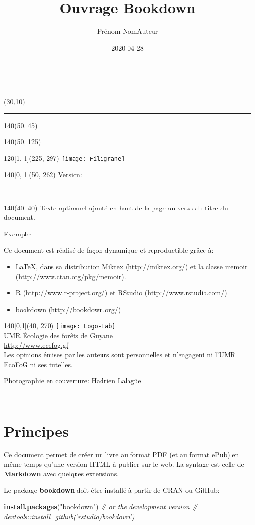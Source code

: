 \documentclass[
  11pt,
  french,
  a4paper,
  extrafontsizes,onecolumn,openright
  ]{memoir}
\title{Ouvrage Bookdown}
\author{Prénom NomAuteur}
\date{2020-04-28}
\newenvironment{Shaded}{\begin{snugshade}}{\end{snugshade}}
\newcommand{\CommentTok}[1]{\textcolor[rgb]{0.56,0.35,0.01}{\textit{#1}}}
\newcommand{\KeywordTok}[1]{\textcolor[rgb]{0.13,0.29,0.53}{\textbf{#1}}}
\newcommand{\NormalTok}[1]{#1}
\newcommand{\StringTok}[1]{\textcolor[rgb]{0.31,0.60,0.02}{#1}}
\newcommand{\MainTitlePage}[1][]{
	\SmallMargins %
	\pagestyle{empty} %
	~\\ %
	\begin{textblock}{2}(30,10)
		\rule{1pt}{\paperheight-20mm}
	\end{textblock}
	\begin{textblock}{140}(50, 45)
		\flushright
		\begin{Spacing}{3}
			{\fontfamily{qtm}\selectfont\fontsize{45}{45}\selectfont \textsc{\thetitle}}
		\end{Spacing}
	\end{textblock}
	\begin{textblock}{140}(50, 125)
		\flushright
		{\fontfamily{qtm}\Large \theauthor}
	\end{textblock}
	\begin{textblock}{120}[1, 1](225, 297)
		\texttt{[image: Filigrane]}
	 \end{textblock}
	\begin{textblock}{140}[0, 1](50, 262)
		\normalfont	Version: \thedate
	\end{textblock}
	\newpage
	~\\ %
	\begin{textblock}{140}(40, 40)
		#1
	\end{textblock}
	\begin{textblock}{140}[0,1](40, 270)
		\centering
    \texttt{[image: Logo-Lab]}\\ \bigskip
		UMR \'Ecologie des forêts de Guyane\\
		\url{http://www.ecofog.gf}\\[3\baselineskip]
		Les opinions émises par les auteurs sont personnelles et n’engagent ni l’UMR EcoFoG ni ses tutelles.

    \tiny{Photographie en couverture: Hadrien Lalagüe}
	\end{textblock}
	\newpage
}
\begin{document}
\frontmatter


\MainTitlePage[Texte optionnel ajouté en haut de la page au verso du titre du document.

Exemple:

Ce document est réalisé de façon dynamique et reproductible grâce à:

\begin{itemize}
  \item \LaTeX, dans sa distribution Miktex (\url{http://miktex.org/}) et la classe memoir (\url{http://www.ctan.org/pkg/memoir}).
  \item R (\url{http://www.r-project.org/}) et RStudio (\url{http://www.rstudio.com/})
  \item bookdown (\url{http://bookdown.org/})
\end{itemize}]

\makeflyleaf
\newpage
~
\newpage









\LargeMargins
{
\hypersetup{linkcolor=}
\setcounter{tocdepth}{3}
\tableofcontents
}



\LargeMargins
\hypertarget{principes}{%
\chapter*{Principes}\label{principes}}

Ce document permet de créer un livre au format PDF (et au format ePub) en même temps qu'une version HTML à publier sur le web.
La syntaxe est celle de \textbf{Markdown} avec quelques extensions.

Le package \textbf{bookdown} doit être installé à partir de CRAN ou GitHub:

\scriptsize

\begin{Shaded}
\begin{Highlighting}[]
\KeywordTok{install.packages}\NormalTok{(}\StringTok{"bookdown"}\NormalTok{)}
\CommentTok{# or the development version}
\CommentTok{# devtools::install_github('rstudio/bookdown')}
\end{Highlighting}
\end{Shaded}
\end{document}
